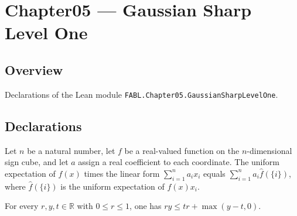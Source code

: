 \chapter{Chapter05 — Gaussian Sharp Level One}
\section{Overview}

Declarations of the Lean module \texttt{FABL.Chapter05.GaussianSharpLevelOne}.

\section{Declarations}

\begin{theorem}
\label{FABL.expect_mul_linearForm_eq_singletonCoeffs}
\leanok
{}
Let $n$ be a natural number, let $f$ be a real-valued function on the $n$-dimensional
sign cube, and let $a$ assign a real coefficient to each coordinate. The uniform
expectation of $f(x)$ times the linear form $\sum_{i=1}^n a_i x_i$ equals $\sum_{i=1}^n
a_i\widehat f(\{i\})$, where $\widehat f(\{i\})$ is the uniform expectation of
$f(x)x_i$.
\end{theorem}

\begin{theorem}
\label{FABL.mul_le_threshold_add_posPart}
\leanok
{}
For every $r,y,t\in\mathbb{R}$ with $0\le r\le 1$, one has $ry\le tr+\max(y-t,0)$.
\end{theorem}

